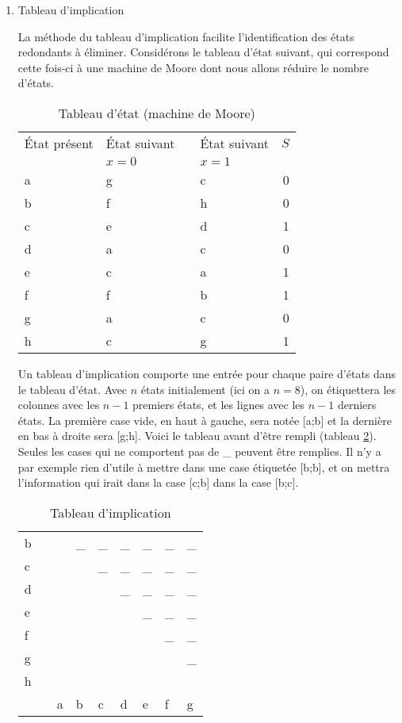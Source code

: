 \documentclass[letter, oneside]{book}
\begin{document}
\begin{enumerate}
\item Tableau d'implication
\label{sec:org133840f}

La méthode du tableau d'implication facilite l'identification des
états redondants à éliminer. Considérons le tableau d'état suivant,
qui correspond cette fois-ci à une machine de Moore dont nous allons
réduire le nombre d'états.

\begin{table}[htbp]
\caption{\label{tab:org07bb4a6}Tableau d'état (machine de Moore)}
\centering
\begin{tabular}{llllr}
État présent & État suivant &  & État suivant & \(S\)\\[0pt]
 & \(x=0\) &  & \(x=1\) & \\[0pt]
\hline
a & g &  & c & 0\\[0pt]
b & f &  & h & 0\\[0pt]
c & e &  & d & 1\\[0pt]
d & a &  & c & 0\\[0pt]
e & c &  & a & 1\\[0pt]
f & f &  & b & 1\\[0pt]
g & a &  & c & 0\\[0pt]
h & c &  & g & 1\\[0pt]
\end{tabular}
\end{table}

Un tableau d'implication comporte une entrée pour chaque paire d'états
dans le tableau d'état. Avec \(n\) états initialement (ici on a
\(n=8\)), on étiquettera les colonnes avec les \(n-1\) premiers états,
et les lignes avec les \(n-1\) derniers états. La première case vide,
en haut à gauche, sera notée [a;b] et la dernière en bas à droite sera
[g;h]. Voici le tableau avant d'être rempli (tableau
\ref{tab:orgbfda734}). Seules les cases qui ne comportent pas de \_
peuvent être remplies. Il n'y a par exemple rien d'utile à mettre dans
une case étiquetée [b;b], et on mettra l'information qui irait dans la
case [c;b] dans la case [b;c].

\begin{table}[htbp]
\caption{\label{tab:orgbfda734}Tableau d'implication}
\centering
\begin{tabular}{lllllllll}
b &  &  & \_ & \_ & \_ & \_ & \_ & \_\\[0pt]
c &  &  &  & \_ & \_ & \_ & \_ & \_\\[0pt]
d &  &  &  &  & \_ & \_ & \_ & \_\\[0pt]
e &  &  &  &  &  & \_ & \_ & \_\\[0pt]
f &  &  &  &  &  &  & \_ & \_\\[0pt]
g &  &  &  &  &  &  &  & \_\\[0pt]
h &  &  &  &  &  &  &  & \\[0pt]
\hline
 &  & a & b & c & d & e & f & g\\[0pt]
\end{tabular}
\end{table}


\end{enumerate}
\end{document}

